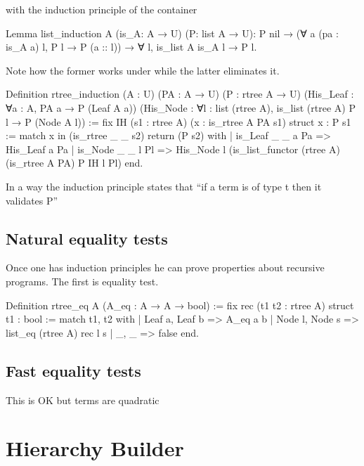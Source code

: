 \documentclass[a4paper, 11pt]{book}
\begin{document}
with the induction principle of the container
\begin{coqcode}
Lemma list_induction A (is_A: A → U) (P: list A → U):
  P nil →
  (∀ a (pa : is_A a) l, P l → P (a :: l)) →
  ∀ l, is_list A is_A l → P l.
\end{coqcode}

Note how the former works under  while the latter eliminates it.

\begin{coqcode}
Definition rtree_induction (A : U) (PA : A → U) (P : rtree A → U)
  (His_Leaf : ∀a : A, PA a → P (Leaf A a))
  (His_Node : ∀l : list (rtree A), is_list (rtree A) P l → P (Node A l)) :=
  fix IH (s1 : rtree A) (x : is_rtree A PA s1) {struct x} : P s1 :=
  match x in (is_rtree _ _ s2) return (P s2) with
  | is_Leaf _ _ a Pa => His_Leaf a Pa
  | is_Node _ _ l Pl => His_Node l (is_list_functor (rtree A) (is_rtree A PA) P IH l Pl)
  end.
\end{coqcode}


In a way the induction principle states that ``if a term is of type t then it validates P''


\subsection{Natural equality tests}

Once one has induction principles he can prove properties about recursive programs.
The first is equality test.

\begin{coqcode}
Definition rtree_eq A (A_eq : A → A → bool) :=
  fix rec (t1 t2 : rtree A) {struct t1} : bool :=
  match t1, t2 with
  | Leaf a, Leaf b => A_eq a b
  | Node l, Node s => list_eq (rtree A) rec l s
  | _, _ => false
  end.
\end{coqcode}



\cite{tassi:hal-01897468}

\subsection{Fast equality tests}

This is OK but terms are quadratic

\cite{gregoire:hal-03800154}


\section{Hierarchy Builder}
\end{document}
